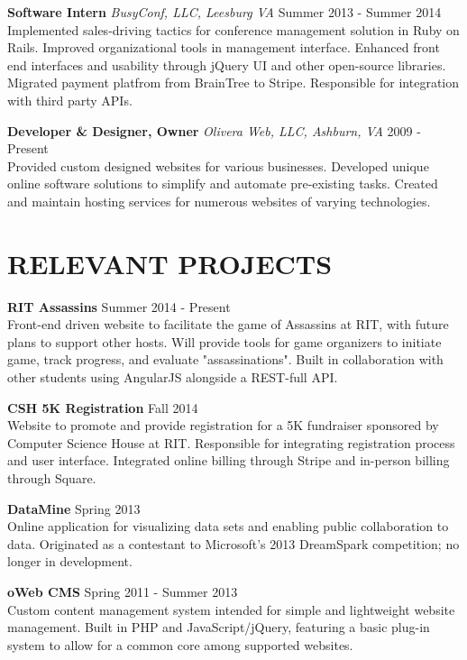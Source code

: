 \documentclass[line]{res}
\begin{document}
\begin{resume}
  \textbf{Software Intern}
  \textit{BusyConf, LLC, Leesburg VA}
  \hfill
  Summer 2013 - Summer 2014\\
  Implemented sales-driving tactics for conference management solution in Ruby on Rails.
  Improved organizational tools in management interface.
  Enhanced front end interfaces and usability through jQuery UI and other open-source libraries.
  Migrated payment platfrom from BrainTree to Stripe.
  Responsible for integration with third party APIs.

  \textbf{Developer \& Designer, Owner}
  \textit{Olivera Web, LLC, Ashburn, VA}
  \hfill
  2009 - Present\\
  Provided custom designed websites for various businesses.
  Developed unique online software solutions to simplify and automate pre-existing tasks.
  Created and maintain hosting services for numerous websites of varying technologies.

\section{RELEVANT PROJECTS}

  \textbf{RIT Assassins}
  \hfill
  Summer 2014 - Present
  \\
  Front-end driven website to facilitate the game of Assassins at RIT, with future plans to support other hosts.
  Will provide tools for game organizers to initiate game, track progress, and evaluate "assassinations". Built in collaboration with other students using AngularJS alongside a REST-full API.

  \textbf{CSH 5K Registration}
  \hfill
  Fall 2014
  \\
  Website to promote and provide registration for a 5K fundraiser sponsored by Computer Science House at RIT.
  Responsible for integrating registration process and user interface.
  Integrated online billing through Stripe and in-person billing through Square.

  \textbf{DataMine}
  \hfill
  Spring 2013
  \\
  Online application for visualizing data sets and enabling public collaboration to data.
  Originated as a contestant to Microsoft's 2013 DreamSpark competition; no longer in development.

  \textbf{oWeb CMS}
  \hfill
  Spring 2011 - Summer 2013
  \\
  Custom content management system intended for simple and lightweight website management.
  Built in PHP and JavaScript/jQuery, featuring a basic plug-in system to allow for a common core among supported websites.


\end{resume}
\end{document}
